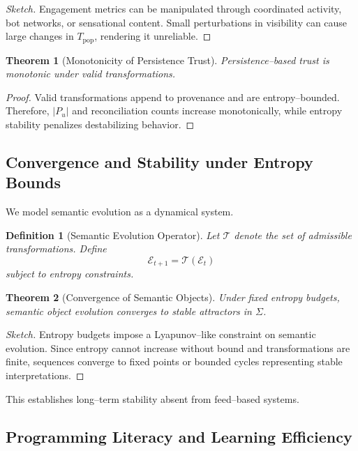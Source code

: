 \documentclass[11pt]{article}
\newtheorem{definition}{Definition}
\newtheorem{theorem}{Theorem}
\begin{document}
\begin{proof}[Sketch]
Engagement metrics can be manipulated through coordinated activity, bot networks, or
sensational content. Small perturbations in visibility can cause large changes in
$T_{\text{pop}}$, rendering it unreliable.
\end{proof}

\begin{theorem}[Monotonicity of Persistence Trust]
Persistence--based trust is monotonic under valid transformations.
\end{theorem}

\begin{proof}
Valid transformations append to provenance and are entropy--bounded. Therefore, $|P_u|$
and reconciliation counts increase monotonically, while entropy stability penalizes
destabilizing behavior.
\end{proof}

\subsection{Convergence and Stability under Entropy Bounds}

We model semantic evolution as a dynamical system.

\begin{definition}[Semantic Evolution Operator]
Let $\mathcal{T}$ denote the set of admissible transformations. Define
\[
\mathcal{E}_{t+1} = \mathcal{T}(\mathcal{E}_t)
\]
subject to entropy constraints.
\end{definition}

\begin{theorem}[Convergence of Semantic Objects]
Under fixed entropy budgets, semantic object evolution converges to stable attractors in
$\Sigma$.
\end{theorem}

\begin{proof}[Sketch]
Entropy budgets impose a Lyapunov--like constraint on semantic evolution. Since entropy
cannot increase without bound and transformations are finite, sequences converge to fixed
points or bounded cycles representing stable interpretations.
\end{proof}

This establishes long--term stability absent from feed--based systems.

\subsection{Programming Literacy and Learning Efficiency}
\end{document}
